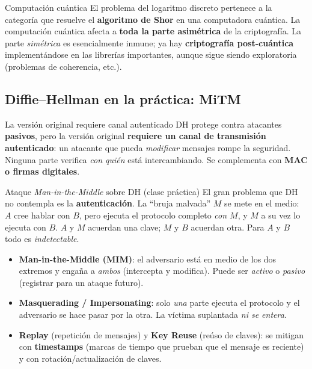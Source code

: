 \documentclass[11pt,a4paper]{article}
\begin{document}
\begin{warnbox}{Computación cuántica}
El problema del logaritmo discreto pertenece a la categoría que resuelve el \textbf{algoritmo
de Shor} en una computadora cuántica. La computación cuántica afecta a \textbf{toda la parte
asimétrica} de la criptografía. La parte \emph{simétrica} es esencialmente inmune; ya hay
\textbf{criptografía post-cuántica} implementándose en las librerías importantes, aunque sigue
siendo exploratoria (problemas de coherencia, etc.).
\end{warnbox}

\subsection{Diffie--Hellman en la práctica: MiTM}
\begin{warnbox}{La versión original requiere canal autenticado}
DH protege contra atacantes \textbf{pasivos}, pero la versión original \textbf{requiere un
canal de transmisión autenticado}: un atacante que pueda \emph{modificar} mensajes rompe la
seguridad. Ninguna parte verifica \emph{con quién} está intercambiando. Se complementa con
\textbf{MAC o firmas digitales}.
\end{warnbox}

\begin{practbox}{Ataque \emph{Man-in-the-Middle} sobre DH (clase práctica)}
El gran problema que DH no contempla es la \textbf{autenticación}. La ``bruja malvada'' $M$ se
mete en el medio: $A$ cree hablar con $B$, pero ejecuta el protocolo completo \emph{con $M$}, y
$M$ a su vez lo ejecuta con $B$. $A$ y $M$ acuerdan una clave; $M$ y $B$ acuerdan otra. Para $A$
y $B$ todo es \emph{indetectable}.
\begin{itemize}[leftmargin=1.4em,itemsep=1pt]
  \item \textbf{Man-in-the-Middle (MIM)}: el adversario está en medio de los dos extremos y
        engaña a \emph{ambos} (intercepta y modifica). Puede ser \emph{activo} o
        \emph{pasivo} (registrar para un ataque futuro).
  \item \textbf{Masquerading / Impersonating}: solo \emph{una} parte ejecuta el protocolo y el
        adversario se hace pasar por la otra. La víctima suplantada \emph{ni se entera}.
  \item \textbf{Replay} (repetición de mensajes) y \textbf{Key Reuse} (reúso de claves): se
        mitigan con \textbf{timestamps} (marcas de tiempo que prueban que el mensaje es
        reciente) y con rotación/actualización de claves.
\end{itemize}
\end{practbox}
\end{document}
